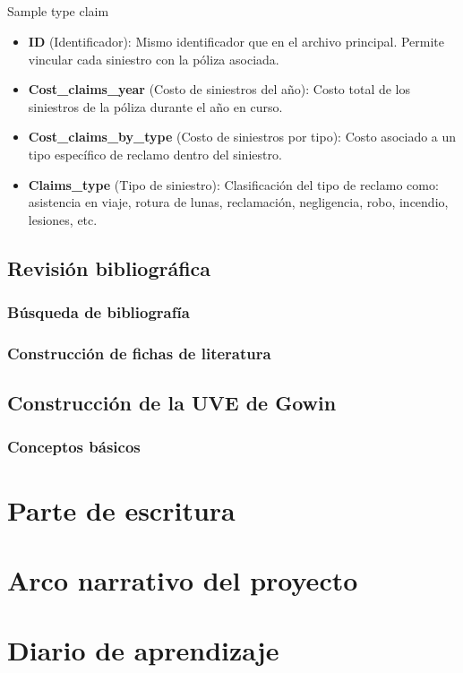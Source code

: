 \documentclass[
  spanish,
  11pt,
  letterpaper,
]{article}
\makeatletter
\let\oldsubparagraph\subparagraph
\renewcommand{\subparagraph}{
    \@ifstar
      \xxxSubParagraphStar
      \xxxSubParagraphNoStar
  }
\newcommand{\xxxSubParagraphStar}[1]{\oldsubparagraph*{#1}\mbox{}}
\newcommand{\xxxSubParagraphNoStar}[1]{\oldsubparagraph{#1}\mbox{}}
\makeatother
\begin{document}
\subparagraph{Sample type claim}\label{sample-type-claim}

\begin{itemize}
\item
  \textbf{ID} (Identificador): Mismo identificador que en el archivo
  principal. Permite vincular cada siniestro con la póliza asociada.
\item
  \textbf{Cost\_claims\_year} (Costo de siniestros del año): Costo total
  de los siniestros de la póliza durante el año en curso.
\item
  \textbf{Cost\_claims\_by\_type} (Costo de siniestros por tipo): Costo
  asociado a un tipo específico de reclamo dentro del siniestro.
\item
  \textbf{Claims\_type} (Tipo de siniestro): Clasificación del tipo de
  reclamo como: asistencia en viaje, rotura de lunas, reclamación,
  negligencia, robo, incendio, lesiones, etc.
\end{itemize}

\subsection{Revisión bibliográfica}\label{revisiuxf3n-bibliogruxe1fica}

\subsubsection{Búsqueda de
bibliografía}\label{buxfasqueda-de-bibliografuxeda}

\subsubsection{Construcción de fichas de
literatura}\label{construcciuxf3n-de-fichas-de-literatura}

\subsection{Construcción de la UVE de
Gowin}\label{construcciuxf3n-de-la-uve-de-gowin}

\subsubsection{Conceptos básicos}\label{conceptos-buxe1sicos}

\section{Parte de escritura}\label{parte-de-escritura}

\section{Arco narrativo del proyecto}\label{arco-narrativo-del-proyecto}

\section{Diario de aprendizaje}\label{diario-de-aprendizaje}
\end{document}
